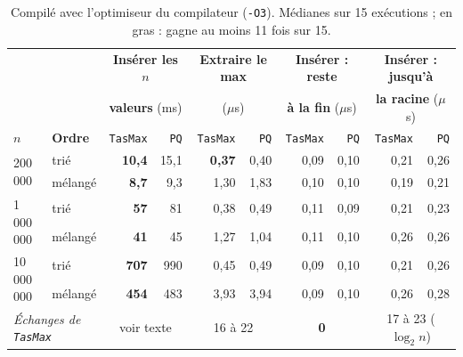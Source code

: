\documentclass[11pt,a4paper]{article}
\begin{document}
\begin{table}[H]
\centering
\small
\setlength{\tabcolsep}{4pt}
\begin{tabular}{|l|l|r|r|r|r|r|r|r|r|}
\hline
\multicolumn{2}{|c|}{} & \multicolumn{2}{c|}{\textbf{Insérer les $n$}} & \multicolumn{2}{c|}{\textbf{Extraire le max}}
  & \multicolumn{2}{c|}{\textbf{Insérer : reste}} & \multicolumn{2}{c|}{\textbf{Insérer : jusqu'à}} \\
\multicolumn{2}{|c|}{} & \multicolumn{2}{c|}{\textbf{valeurs} (ms)} & \multicolumn{2}{c|}{($\mu$s)}
  & \multicolumn{2}{c|}{\textbf{à la fin} ($\mu$s)} & \multicolumn{2}{c|}{\textbf{la racine} ($\mu$s)} \\
\hline
$n$ & \textbf{Ordre} & \texttt{TasMax} & \texttt{PQ} & \texttt{TasMax} & \texttt{PQ}
    & \texttt{TasMax} & \texttt{PQ} & \texttt{TasMax} & \texttt{PQ} \\
\hline
\multirow{2}{*}{200\,000}     & trié    & \textbf{10,4} & 15,1 & \textbf{0,37} & 0,40 & 0,09 & 0,10 & 0,21 & 0,26 \\
\cline{2-10}
                              & mélangé & \textbf{8,7}  & 9,3  & 1,30 & 1,83 & 0,10 & 0,10 & 0,19 & 0,21 \\
\hline
\multirow{2}{*}{1\,000\,000}  & trié    & \textbf{57}   & 81   & 0,38 & 0,49 & 0,11 & 0,09 & 0,21 & 0,23 \\
\cline{2-10}
                              & mélangé & \textbf{41}   & 45   & 1,27 & 1,04 & 0,11 & 0,10 & 0,26 & 0,26 \\
\hline
\multirow{2}{*}{10\,000\,000} & trié    & \textbf{707}  & 990  & 0,45 & 0,49 & 0,09 & 0,10 & 0,21 & 0,26 \\
\cline{2-10}
                              & mélangé & \textbf{454}  & 483  & 3,93 & 3,94 & 0,09 & 0,10 & 0,26 & 0,28 \\
\hline
\multicolumn{2}{|l|}{\textit{Échanges de \texttt{TasMax}}} & \multicolumn{2}{c|}{voir texte} & \multicolumn{2}{c|}{16 à 22}
  & \multicolumn{2}{c|}{\textbf{0}} & \multicolumn{2}{c|}{17 à 23 ($\log_2 n$)} \\
\hline
\end{tabular}
\caption{Compilé avec l'optimiseur du compilateur (\texttt{-O3}). Médianes sur 15 exécutions ;
en gras : gagne au moins 11 fois sur 15.}
\end{table}
\end{document}
